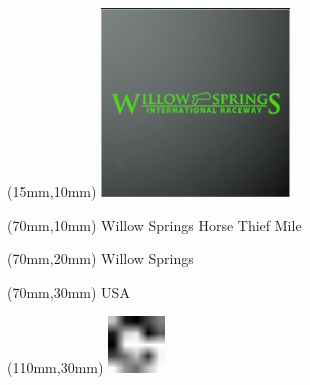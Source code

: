 \null\newpage
\begin{textblock*}{50mm}(15mm,10mm)%
\includegraphics[width=50mm]{LG/2015-05-20_00098.png}
\end{textblock*}
\begin{textblock*}{130mm}(70mm,10mm)%
{\fontsize{20}{20}\selectfont Willow Springs Horse Thief Mile}\\
\end{textblock*}
\begin{textblock*}{120mm}(70mm,20mm)%
{\fontsize{16}{16}\selectfont Willow Springs}\\
\end{textblock*}
\begin{textblock*}{120mm}(70mm,30mm)%
{\fontsize{12}{12}\selectfont USA}
\end{textblock*}
\begin{textblock*}{30mm}(110mm,30mm)%
\centering
\includegraphics[height=15mm]{icons/fa-rotate-right.pdf}
\end{textblock*}
